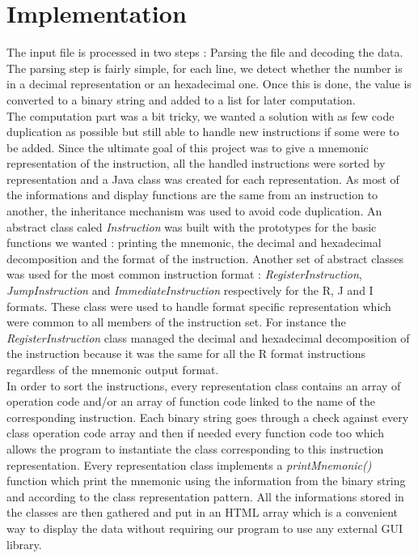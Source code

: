 \section{Implementation}

The input file is processed in two steps : Parsing the file and decoding the data. The parsing step is fairly simple, for each line, we detect whether the number is in a decimal representation or an hexadecimal one. Once this is done, the value is converted to a binary string and added to a list for later computation. \\
The computation part was a bit tricky, we wanted a solution with as few code duplication as possible but still able to handle new instructions if some were to be added. Since the ultimate goal of this project was to give a mnemonic representation of the instruction, all the handled instructions were sorted by representation and a Java class was created for each representation. As most of the informations and display functions are the same from an instruction to another, the inheritance mechanism was used to avoid code duplication. An abstract class caled \textit{Instruction} was built with the prototypes for the basic functions we wanted : printing the mnemonic, the decimal and hexadecimal decomposition and the format of the instruction. Another set of abstract classes was used for the most common instruction format : \textit{RegisterInstruction}, \textit{JumpInstruction} and \textit{ImmediateInstruction} respectively for the R, J and I formats. These class were used to handle format specific representation which were common to all members of the instruction set. For instance the \textit{RegisterInstruction} class managed the decimal and hexadecimal decomposition of the instruction because it was the same for all the R format instructions regardless of the mnemonic output format. \\
In order to sort the instructions, every representation class contains an array of operation code and/or an array of function code linked to the name of the corresponding instruction. Each binary string goes through a check against every class operation code array and then if needed every function code too which allows the program to instantiate the class corresponding to this instruction representation. Every representation class implements a \textit{printMnemonic()} function which print the mnemonic using the information from the binary string and according to the class representation pattern.      
All the informations stored in the classes are then gathered and put in an HTML array which is a convenient way to display the data without requiring our program to use any external GUI library. 